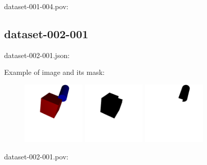 dataset-001-004.pov:
\begin{scriptsize}
\begin{ttfamily}

\end{ttfamily}
\end{scriptsize}

\subsection{dataset-002-001}

dataset-002-001.json:
\begin{scriptsize}
\begin{ttfamily}

\end{ttfamily}
\end{scriptsize}

Example of image and its mask:
\begin{center}
\begin{figure}[H]
\centering\includegraphics[width=3cm]{./img-002-001.png}
\centering\includegraphics[width=3cm]{./mask-002-001-000.png}
\centering\includegraphics[width=3cm]{./mask-002-001-001.png}
\end{figure}
\end{center}

dataset-002-001.pov:
\begin{scriptsize}
\begin{ttfamily}

\end{ttfamily}
\end{scriptsize}

